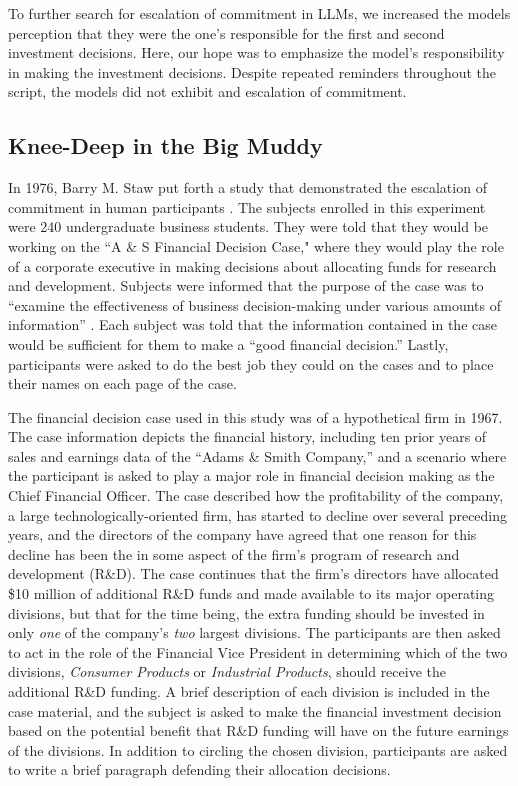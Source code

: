 \documentclass{article}
\begin{document}
To further search for escalation of commitment in LLMs, we increased the models perception that they were the one's responsible for the first and second investment decisions. Here, our hope was to emphasize the model's responsibility in making the investment decisions. Despite repeated reminders throughout the script, the models did not exhibit and escalation of commitment.

\subsection{Knee-Deep in the Big Muddy}

In 1976, Barry M. Staw put forth a study that demonstrated the escalation of commitment in human participants \cite{Staw-1976}. The subjects enrolled in this experiment were 240 undergraduate business students. They were told that they would be working on the ``A \& S Financial Decision Case," where they would play the role of a corporate executive in making decisions about allocating funds for research and development. Subjects were informed that the purpose of the case was to ``examine the effectiveness of business decision-making under various amounts of information'' \cite{Staw-1976}. Each subject was told that the information contained in the case would be sufficient for them to make a ``good financial decision.'' Lastly, participants were asked to do the best job they could on the cases and to place their names on each page of the case.

The financial decision case used in this study was of a hypothetical firm in 1967. The case information depicts the financial history, including ten prior years of sales and earnings data of the ``Adams \& Smith Company,'' and a scenario where the participant is asked to play a major role in financial decision making as the Chief Financial Officer. The case described how the profitability of the company, a large technologically-oriented firm, has started to decline over several preceding years, and the directors of the company have agreed that one reason for this decline has been the in some aspect of the firm's program of research and development (R\&D). The case continues that the firm's directors have allocated \$10 million of additional R\&D funds and made available to its major operating divisions, but that for the time being, the extra funding should be invested in only \textit{one} of the company's \textit{two} largest divisions. The participants are then asked to act in the role of the Financial Vice President in determining which of the two divisions, \textit{Consumer Products} or \textit{Industrial Products}, should receive the additional R\&D funding. A brief description of each division is included in the case material, and the subject is asked to make the financial investment decision based on the potential benefit that R\&D funding will have on the future earnings of the divisions. In addition to circling the chosen division, participants are asked to write a brief paragraph defending their allocation decisions.
\end{document}
